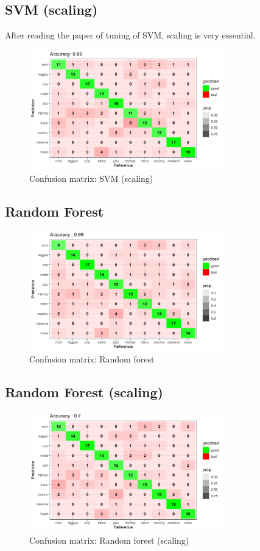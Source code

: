\documentclass[12pt,a4paper]{article}
\begin{document}
\subsection{SVM (scaling)}
After reading the paper of tuning of SVM, scaling is very essential.
\begin{figure}[h]
    \includegraphics[width=0.75\textwidth]{confusionMatrix_svm_std.png}
    \caption{Confusion matrix: SVM (scaling)}
\end{figure}
\newpage

\subsection{Random Forest}
\begin{figure}[h]
    \includegraphics[width=0.75\textwidth]{confusionMatrix_randomforest.png}
    \caption{Confusion matrix: Random forest}
\end{figure}

\subsection{Random Forest (scaling)}
\begin{figure}[h]
    \includegraphics[width=0.75\textwidth]{confusionMatrix_randomforest_std.png}
    \caption{Confusion matrix: Random forest (scaling)}
\end{figure}
\end{document}
